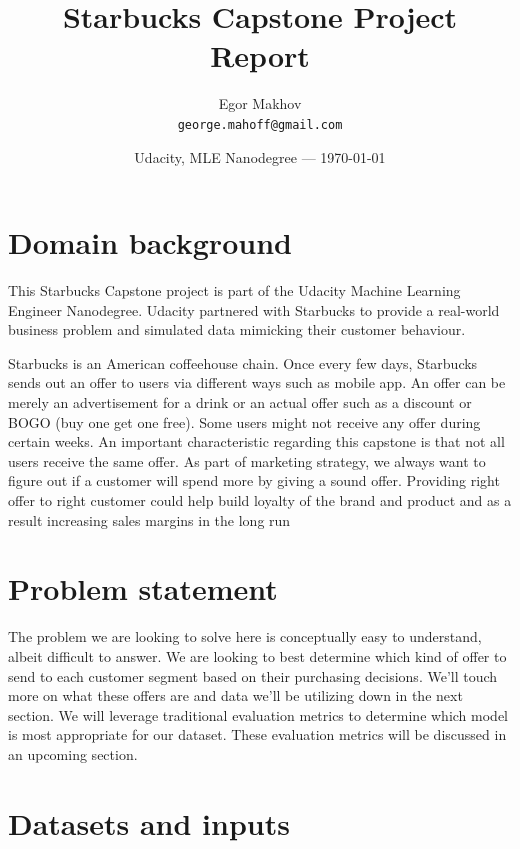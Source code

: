 \documentclass{article}
\title{Starbucks Capstone Project Report} %
\author{Egor Makhov\\ \texttt{george.mahoff@gmail.com}} %
\date{Udacity, MLE Nanodegree --- \today} %
\begin{document}
\maketitle %


\section*{Domain background}
This Starbucks Capstone project is part of the Udacity Machine Learning Engineer Nanodegree. Udacity partnered with Starbucks to provide a real-world business problem and simulated data mimicking their customer behaviour.

Starbucks is an American coffeehouse chain. Once every few days, Starbucks sends out an offer to users via different ways such as mobile app. An offer can be merely an advertisement for a drink or an actual offer such as a discount or BOGO (buy one get one free). Some users might not receive any offer during certain weeks. An important characteristic regarding this capstone is that not all users receive the same offer. As part of marketing strategy, we always want to figure out if a customer will spend more by giving a sound offer. Providing right offer to right customer could help build loyalty of the brand and product and as a result increasing sales margins in the long run

\section*{Problem statement}

The problem we are looking to solve here is conceptually easy to understand, albeit difficult to answer. We are looking to best determine which kind of offer to send to each customer segment based on their purchasing decisions. We’ll touch more on what these offers are and data we’ll be utilizing down in the next section. We will leverage traditional evaluation metrics to determine which model is most appropriate for our dataset. These evaluation metrics will be discussed in an upcoming section.

\section*{Datasets and inputs}
\end{document}

